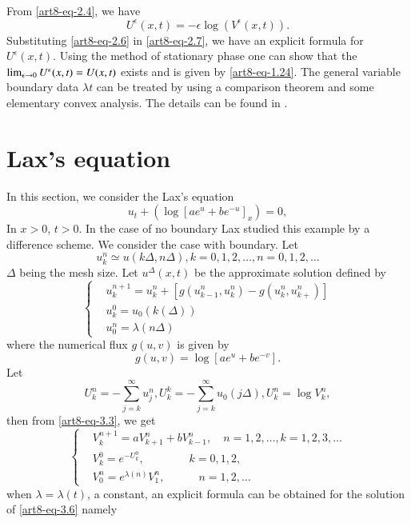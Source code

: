 From \eqref{art8-eq-2.4}, we have
\begin{equation}\label{art8-eq-2.7}
U^{\epsilon}(x, t)= -\epsilon\log(V^{\epsilon}(x, t)).
\end{equation}
Substituting \eqref{art8-eq-2.6} in \eqref{art8-eq-2.7}, we have an explicit formula for $U^{\epsilon}(x,t)$. Using the method of stationary phase one can show that the $\lim_{\epsilon \rightarrow 0}U^{\epsilon}\break (x, t)=U(x,t)$ exists and is given by \eqref{art8-eq-1.24}. The general variable boundary data $\lambda{t}$ can be treated by using a comparison theorem and some elementary convex analysis. The details can be found in \cite{art8-key3}.

\section{Lax's equation}\label{art8-sec-3}

In this section, we consider the Lax's equation
\begin{equation}\label{art8-eq-3.1}
u_{t}+ \left(\log \left[ae^{u} + be^{-u}\right]_{x}\right)= 0,
\end{equation}
In $x>0$, $t>0$. In the case of no boundary Lax \cite{art8-key9} studied this example by a difference scheme. We consider the case with boundary. Let
\begin{equation}\label{art8-eq-3.2}
u_{k}^{n}\simeq u(k\Delta, n\Delta), k=0,1,2,\ldots,n = 0,1,2,\ldots
\end{equation}
$\Delta$ being the mesh size. Let $u^{\Delta}(x,t)$ be the approximate solution defined by
\begin{equation}\label{art8-eq-3.3}
\left\{
\begin{aligned}
&u_{k}^{n+1} = u_{k}^{n} + \left[g(u_{k-1}^{n}, u_{k}^{n})-g(u_{k}^{n}, u_{k+}^{n})\right]\\
&u_{k}^{0} = u_{0}(k(\Delta))\\
&u_{0}^{n} = \lambda(n\Delta)
\end{aligned}
\right.
\end{equation}
where the numerical flux $g(u,v)$ is given by
\begin{equation}\label{art8-eq-3.4}
g(u,v) = \log \left[ae^{u} + be^{-v}\right].
\end{equation}
Let
\begin{equation}\label{art8-eq-3.5}
U_{k}^{n} = -\sum\limits_{j=k}^{\infty} u_{j}^{n}, U_{k}^{k} = -\sum_{j=k}^{\infty} u_{0}(j \Delta), U_{k}^{n}= \log V_{k}^{n},
\end{equation}
then from \eqref{art8-eq-3.3}, we get
\begin{equation}\label{art8-eq-3.6}
\left\{
\begin{aligned}
&V_{k}^{n+1} =aV_{k+1}^{n} +bV_{k-1}^{n}, \quad n=1,2,\ldots,k=1,2,3,\ldots\\
&V_{k}^{0}=e^{-U_{k}^{0}}, \qquad \qquad  k=0,1,2,\\
&V_{0}^{n} =e^{\lambda(n)}V_{1}^{n}, \qquad  \quad n=1,2,\ldots  
\end{aligned}
\right.
\end{equation}
when $\lambda = \lambda(t)$, a constant, an explicit formula can be obtained for the solution of \eqref{art8-eq-3.6} namely

